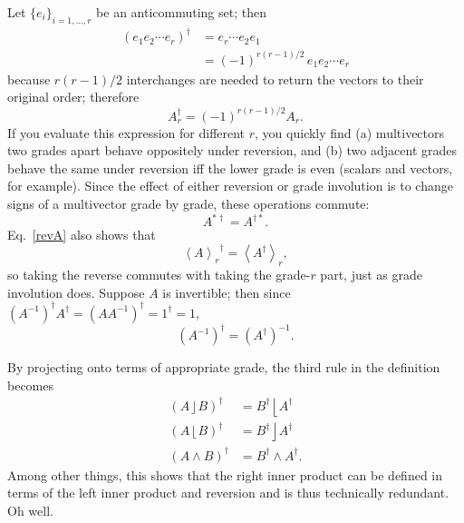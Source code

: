 \documentclass{utarticle}
\DeclareMathOperator{\lin}{\rfloor}
\DeclareMathOperator{\rin}{\lfloor}
\DeclareMathOperator{\out}{\wedge}
\newcommand{\rev}[1]{\ensuremath{#1^\dagger}}
\newcommand{\grinvrev}[1]{\ensuremath{#1^{*\dagger}}}
\newcommand{\revgrinv}[1]{\ensuremath{#1^{\dagger *}}}
\newcommand{\grade}[2][]{\ensuremath{\left\langle #2 \right\rangle_{#1}}}
\begin{document}
Let $\{e_i\}_{i=1,\dotsc,r}$ be an anticommuting set; then
\begin{align}
\rev{(e_1 e_2 \dotsb e_r)} & = e_r \dotsb e_2 e_1 \nonumber \\
 & = (-1)^{r(r-1)/2} \, e_1 e_2 \dotsb e_r
\end{align}
because $r(r-1)/2$ interchanges are needed to return the vectors to 
their original order; therefore
\begin{equation} \rev{A_r} = (-1)^{r(r-1)/2} A_r. \label{revA} \end{equation}
If you evaluate this expression for different $r$, you quickly find (a) multivectors 
two grades apart behave oppositely under reversion, and (b) two adjacent 
grades behave the same under reversion iff the lower grade is even (scalars 
and vectors, for example).  Since the effect of either reversion or grade involution 
is to change signs of a multivector grade by grade, these operations commute:  
\begin{equation} \grinvrev{A} = \revgrinv{A}.  \end{equation}
Eq.~\eqref{revA} also shows that
\begin{equation}
\rev{\grade[r]{A}} = \grade[r]{\rev{A}},
\end{equation}
so taking the reverse commutes with taking the grade-$r$ part, just as grade
involution does.  Suppose $A$ is invertible;
then since $\rev{(A^{-1})}\rev{A} = \rev{(A A^{-1})} = \rev{1} = 1$,
\begin{equation} \rev{(A^{-1})} = (\rev{A})^{-1}. \end{equation}

By projecting onto terms of appropriate grade, the third 
rule in the definition becomes
\begin{align}
\rev{(A \lin B)} & = \rev{B} \rin \rev{A} \nonumber \\
\rev{(A \rin B)} & = \rev{B} \lin \rev{A} \nonumber \\
\rev{(A \out B)} & = \rev{B} \out \rev{A}.
\label{revprods}
\end{align}
Among other things, this shows that the right inner product can be defined in terms 
of the left inner product and reversion and is thus technically redundant.  Oh well.
\end{document}
